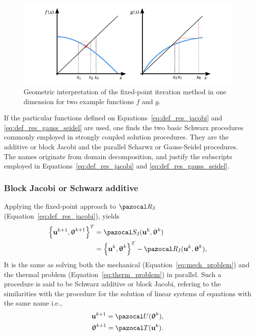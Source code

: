 \begin{figure}
  \includegraphics{figures/fixed_point_iteration}
  \caption{Geometric interpretation of the fixed-point iteration method in one dimension for two example functions \(f\) and \(g\).}
  \label{fig:fixed_point_iteration}
\end{figure}

If the particular functions defined on Equations~\eqref{eq:def_res_jacobi} and \eqref{eq:def_res_gauss_seidel} are used, one finds the  two basic Schwarz procedures commonly employed in strongly coupled solution procedures.
They are the additive or block Jacobi and the parallel Scharwz or Gauss-Seidel procedures.
The names originate from domain decomposition, and justify the subscripts employed in Equations~\eqref{eq:def_res_jacobi} and \eqref{eq:def_res_gauss_seidel}.

\subsubsection{Block Jacobi or Schwarz additive}

Applying the fixed-point approach to \(\pazocal R_\mathrm{J}\) (Equation~\eqref{eq:def_res_jacobi}), yields
\begin{align}
  \left\{\mathbf u^{k+1}, \bm\uptheta^{k+1}\right\}^T &= \pazocal S_\mathrm{J}(\mathbf u^k, \bm\uptheta^k)\\
   &= \left\{\mathbf u^k, \bm\uptheta^k\right\}^T - \pazocal R_\mathrm{J}(\mathbf u^k, \bm \uptheta^k),
\end{align}
It is the same as solving both the mechanical (Equation~\eqref{eq:mech_problem}) and the thermal problem (Equation~\eqref{eq:therm_problem}) in parallel.
Such a procedure is said to be Schwarz additive or block Jacobi, refering to the similarities with the procedure for the solution of linear systems of equations with the same name i.e.,
\begin{gather}
\mathbf u^{k+1} = \pazocal U(\bm \uptheta^k),\\
\bm \uptheta^{k+1} = \pazocal T(\mathbf u^k).
\end{gather}

